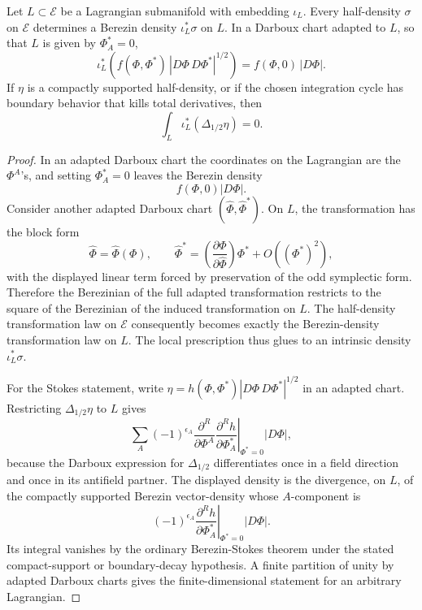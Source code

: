 \begin{proposition}
\label{prop:bv-half-density-restriction-stokes}
Let \(L\subset\mathcal E\) be a Lagrangian submanifold with embedding
\(\iota_L\).  Every half-density \(\sigma\) on \(\mathcal E\) determines a
Berezin density \(\iota_L^*\sigma\) on \(L\).  In a Darboux chart adapted to
\(L\), so that \(L\) is given by \(\Phi^*_A=0\),
\[
  \iota_L^*\!\left(f(\Phi,\Phi^*)\,|D\Phi\,D\Phi^*|^{1/2}\right)
  =
  f(\Phi,0)\,|D\Phi|.
\]
If \(\eta\) is a compactly supported half-density, or if the chosen
integration cycle has boundary behavior that kills total derivatives, then
\begin{equation}
  \int_L \iota_L^*(\Delta_{1/2}\eta)=0 .
  \label{eq:bv-stokes-half-density}
\end{equation}
\end{proposition}

\begin{proof}
In an adapted Darboux chart the coordinates on the Lagrangian are the
\(\Phi^A\)'s, and setting \(\Phi_A^*=0\) leaves the Berezin density
\[
  f(\Phi,0)|D\Phi|.
\]
Consider another adapted Darboux chart
\((\widehat\Phi,\widehat\Phi^*)\).  On \(L\), the transformation has the block
form
\[
  \widehat\Phi=\widehat\Phi(\Phi),
  \qquad
  \widehat\Phi^*=
  \left(\frac{\partial \Phi}{\partial\widehat\Phi}\right)\Phi^*
  +O((\Phi^*)^2),
\]
with the displayed linear term forced by preservation of the odd symplectic
form.  Therefore the Berezinian of the full adapted transformation restricts
to the square of the Berezinian of the induced transformation on \(L\).  The
half-density transformation law on \(\mathcal E\) consequently becomes exactly
the Berezin-density transformation law on \(L\).  The local prescription thus
glues to an intrinsic density \(\iota_L^*\sigma\).

For the Stokes statement, write
\(\eta=h(\Phi,\Phi^*)|D\Phi\,D\Phi^*|^{1/2}\) in an adapted chart.  Restricting
\(\Delta_{1/2}\eta\) to \(L\) gives
\[
  \sum_A
  (-1)^{\epsilon_A}
  \frac{\partial^R}{\partial\Phi^A}
  \left.
  \frac{\partial^R h}{\partial\Phi^*_A}
  \right|_{\Phi^*=0}
  |D\Phi|,
\]
because the Darboux expression for \(\Delta_{1/2}\) differentiates once in a
field direction and once in its antifield partner.  The displayed density is
the divergence, on \(L\), of the compactly supported Berezin vector-density
whose \(A\)-component is
\[
  (-1)^{\epsilon_A}
  \left.
  \frac{\partial^R h}{\partial\Phi_A^*}
  \right|_{\Phi^*=0}
  |D\Phi|.
\]
Its integral vanishes by the ordinary Berezin-Stokes theorem under the stated
compact-support or boundary-decay hypothesis.  A finite partition of unity by
adapted Darboux charts gives the finite-dimensional statement for an arbitrary
Lagrangian.
\end{proof}

